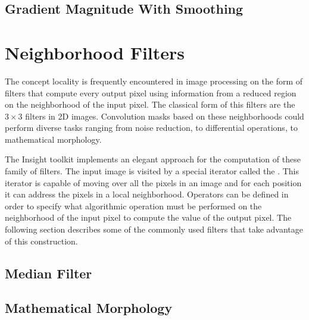 

\subsection{Gradient Magnitude With Smoothing}
\label{sec:GradientMagnitudeRecursiveGaussianImageFilter}






\section{Neighborhood Filters}
\label{sec:NeighborhoodFilters}

The concept locality is frequently encountered in image processing on the form
of filters that compute every output pixel using information from a reduced
region on the neighborhood of the input pixel. The classical form of this
filters are the $3 \times 3$ filters in 2D images. Convolution masks based on
these neighborhoods could perform diverse tasks ranging from noise reduction,
to differential operations, to mathematical morphology.

The Insight toolkit implements an elegant approach for the computation of these
family of filters. The input image is visited by a special iterator called the
. This iterator is capable of moving over all
the pixels in an image and for each position it can address the pixels in a
local neighborhood. Operators can be defined in order to specify what
algorithmic operation must be performed on the neighborhood of the input pixel
to compute the value of the output pixel. The following section describes some
of the commonly used filters that take advantage of this construction.  

\subsection{Median Filter}
\label{sec:MedianFilter}




\subsection{Mathematical Morphology}
\label{sec:MathematicalMorphology}





